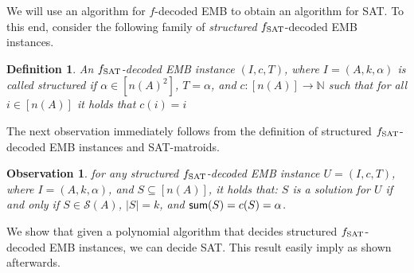 \documentclass[11pt,letter]{article}
\newcommand{\fs}{f_{\textnormal{SAT}}}
\newtheorem{definition}[lemma]{Definition}
\newtheorem{observation}[lemma]{Observation}
\begin{document}
	

	
	
	
	We will use an algorithm for $f$-decoded EMB to obtain an algorithm for SAT. To this end, consider the following family of {\em structured } $\fs$-decoded EMB instances.
		
		
											\begin{definition}
			\label{def:problemE}
			An $\fs$-{\sc decoded EMB} instance $(I,c,T)$, where $I = (A,k,\alpha)$ is called {\em structured} if  $\alpha \in \left[ {n(A)}^2 \right]$, $T = \alpha$, and $c: \left[ n(A) \right] \rightarrow \mathbb{N}$ such that for all $i \in \left[ n(A) \right]$ it holds that $c(i) = i$ %
		\end{definition}
		
		
		The next observation immediately follows from the definition of structured $\fs$-decoded EMB instances and SAT-matroids. 
		
		\begin{observation}
			\label{obs:YesNoD}
			for any structured $\fs$-{\sc decoded EMB} instance $U = (I,c,T)$, where $I = (A,k,\alpha)$, and $S \subseteq \left[ n(A)\right]$, it holds that: $S$ is a solution for $U$ if and only if $S \in \mathcal{S}(A)$, $|S| = k$, and $\textnormal{\textsf{sum}}(S) = c(S) = \alpha$. 
		\end{observation}
		
		We show that given a polynomial algorithm that decides structured $\fs$-decoded EMB instances, we can decide SAT. This result easily imply  as shown afterwards.  
		
\end{document}
